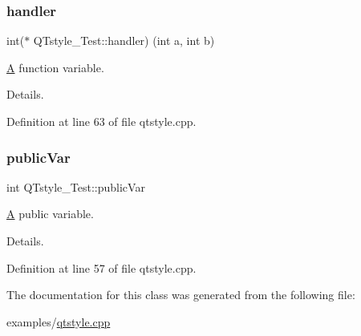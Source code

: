 \subsubsection{\texorpdfstring{handler}{handler}}
{\footnotesize\ttfamily int($\ast$ Q\+Tstyle\+\_\+\+Test\+::handler) (int a, int b)}



\mbox{\hyperlink{class_a}{A}} function variable. 

Details. 

Definition at line 63 of file qtstyle.\+cpp.

\mbox{\label{class_q_tstyle___test_aabf7b2e9ed83ea44aca4d213baae06d3}} 
\subsubsection{\texorpdfstring{publicVar}{publicVar}}
{\footnotesize\ttfamily int Q\+Tstyle\+\_\+\+Test\+::public\+Var}



\mbox{\hyperlink{class_a}{A}} public variable. 

Details. 

Definition at line 57 of file qtstyle.\+cpp.



The documentation for this class was generated from the following file\+:\begin{DoxyCompactItemize}
\item 
examples/\mbox{\hyperlink{qtstyle_8cpp}{qtstyle.\+cpp}}\end{DoxyCompactItemize}
